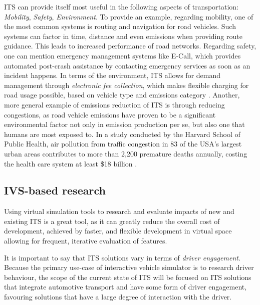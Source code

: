 \documentclass[main.tex]{subfiles}
\begin{document}
ITS can provide itself most useful in the following aspects of transportation: 
\emph{Mobility}, \emph{Safety}, \emph{Environment}. To provide an example, regarding mobility, 
one of the most common systems is routing and navigation for road vehicles. Such systems can 
factor in time, distance and even emissions when providing route guidance. This leads to 
increased performance of road networks. Regarding safety, one can mention emergency management
systems like E-Call, which provides automated post-crash assistance by contacting emergency
services as soon as an incident happens. In terms of the environment, 
ITS allows for demand management through \emph{electronic fee collection}, which makes flexible 
charging for road usage possible, based on vehicle type and emissions category \cite{Commision2022}.
Another, more general example of emissions reduction of ITS is through reducing congestions, as road vehicle 
emissions have proven to be a significant environmental factor not only in emission production
per se, but also one that humans are most exposed to. In a study conducted by the Harvard
School of Public Health, air pollution from traffic congestion in 83 of the USA's largest urban
areas contributes to more than 2,200 premature deaths annually, costing the health care system at
least \$18 billion \cite{Levy2011}.

\subsection{IVS-based research}

Using virtual simulation tools to research and evaluate impacts of new and existing ITS 
is a great tool, as it can greatly reduce the overall cost of development, achieved by faster, 
and flexible development in virtual space allowing for frequent, iterative evaluation of features.

It is important to say that ITS solutions vary in terms of \emph{driver engagement}. Because
the primary use-case of interactive vehicle simulator is to research driver behaviour, the 
scope of the current state of ITS will be focused on ITS solutions that integrate automotive 
transport and have some form of driver engagement, favouring solutions that have a large degree 
of interaction with the driver.
\end{document}
